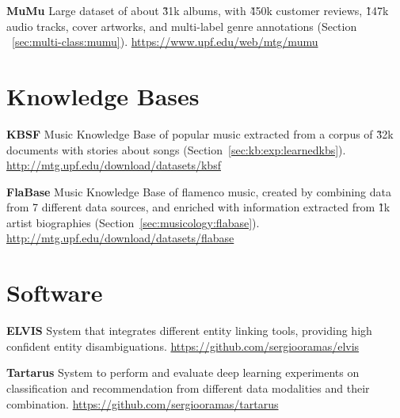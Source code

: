\vspace{0.2cm}

\noindent \textbf{MuMu} Large dataset of about \~31k albums, with \~450k customer reviews, \~147k audio tracks, cover artworks, and multi-label genre annotations (Section ~\ref{sec:multi-class:mumu}). \url{https://www.upf.edu/web/mtg/mumu}

\section{Knowledge Bases}

\noindent \textbf{KBSF} Music Knowledge Base of popular music extracted from a corpus of \~32k documents with stories about songs (Section~\ref{sec:kb:exp:learnedkbs}). \url{http://mtg.upf.edu/download/datasets/kbsf}

\vspace{0.2cm}

\noindent \textbf{FlaBase} Music Knowledge Base of flamenco music, created by combining data from 7 different data sources, and enriched with information extracted from \~1k artist biographies (Section~\ref{sec:musicology:flabase}). \url{http://mtg.upf.edu/download/datasets/flabase}


\section{Software}

\noindent \textbf{ELVIS} System that integrates different entity linking tools, providing high confident entity disambiguations. \url{https://github.com/sergiooramas/elvis}

\vspace{0.2cm}

\noindent \textbf{Tartarus} System to perform and evaluate deep learning experiments on classification and recommendation from different data modalities and their combination. \url{https://github.com/sergiooramas/tartarus}
 
